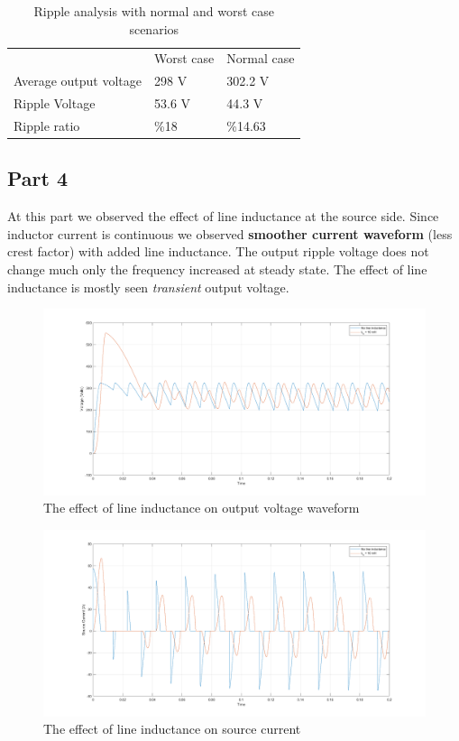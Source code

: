 \documentclass[fleqn, a4paper]{article}
\begin{document}
\begin{table}[H]
\centering
\begin{tabular}{lll}
                       & Worst case & Normal case \\
Average output voltage & 298 V      & 302.2 V     \\
Ripple Voltage         & 53.6 V     & 44.3 V      \\
Ripple ratio           & \%18       & \%14.63    
\end{tabular}
\caption{Ripple analysis with normal and worst case scenarios}
\end{table}
\subsection*{Part 4}
At this part we observed the effect of line inductance at the source side. Since inductor current is continuous we observed \textbf{smoother current waveform} (less crest factor) with added line inductance. The output ripple voltage does not change much only the frequency increased at steady state. The effect of line inductance is mostly seen \textit{transient} output voltage. 
\begin{figure}[H]
  \includegraphics[width=\linewidth]{part2d.png}
  \caption{The effect of line inductance on output voltage waveform}
  \label{fig:simulink3}
\end{figure}
\begin{figure}[H]
  \includegraphics[width=\linewidth]{part2d2.png}
  \caption{The effect of line inductance on source current}
  \label{fig:simulink3}
\end{figure}
\end{document}
